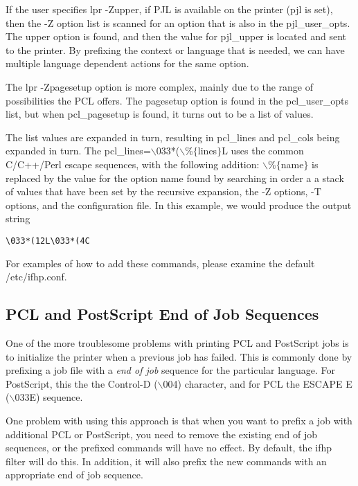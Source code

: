 \documentclass[a4paper]{article}
\begin{document}
If the user specifies
{\ttfamily lpr -Zupper},
if
{\ttfamily PJL}
is available on the printer
({\ttfamily pjl} is set),
then the
{\ttfamily -Z}
option list is scanned for an option that is also in the
{\ttfamily pjl\_user\_opts}.
The
{\ttfamily upper}
option is found,
and then the value for
{\ttfamily pjl\_upper}
is located and sent to the printer.
By prefixing the context or language that is needed,
we can have multiple language dependent actions for the same option.

The
{\ttfamily lpr -Zpagesetup}
option is more complex,
mainly due to the range of possibilities the PCL offers.
The
{\ttfamily pagesetup}
option is found in the
{\ttfamily pcl\_user\_opts} list,
but when
{\ttfamily pcl\_pagesetup}
is found,
it turns out to be a list of values.

The list values are expanded in turn,
resulting in
{\ttfamily pcl\_lines}
and
{\ttfamily pcl\_cols}
being expanded in turn.
The {\ttfamily pcl\_lines=$\backslash$033*($\backslash$\%$\{$lines$\}$L}
uses the common C/C++/Perl escape sequences,
with the following addition:
{\ttfamily $\backslash$\%$\{$name$\}$}
is replaced by the value for the option name found by searching
in order a
a stack of values that have been set by the recursive expansion,
the
{\ttfamily -Z} options,
{\ttfamily -T} options, 
and the configuration file.
In this example,
we would produce the output string
\begin{tscreen}
\begin{verbatim}
\033*(12L\033*(4C
\end{verbatim}
\end{tscreen}


For examples of how to add these commands,
please examine the default
{\ttfamily /etc/ifhp.conf}.


\subsection{PCL and PostScript End of Job Sequences
\label{no_ps_eoj}
\label{no_pcl_eoj}}

One of the more troublesome problems with printing PCL and PostScript
jobs is to initialize the printer when a previous job has failed.
This is commonly done by prefixing a job file with a
{\itshape end of job\/}
sequence for the particular language.
For PostScript,
this the the Control-D ({\ttfamily $\backslash$004}) character,
and for PCL the ESCAPE E ({\ttfamily $\backslash$033E}) sequence.

One problem with using this approach is that when you want to prefix a job
with additional PCL or PostScript,
you need to remove the existing end of job sequences,
or the prefixed commands will have no effect.
By default,
the {\ttfamily ifhp}
filter will do this.
In addition,
it will also
prefix the new commands with
an appropriate end of job sequence.
\end{document}
